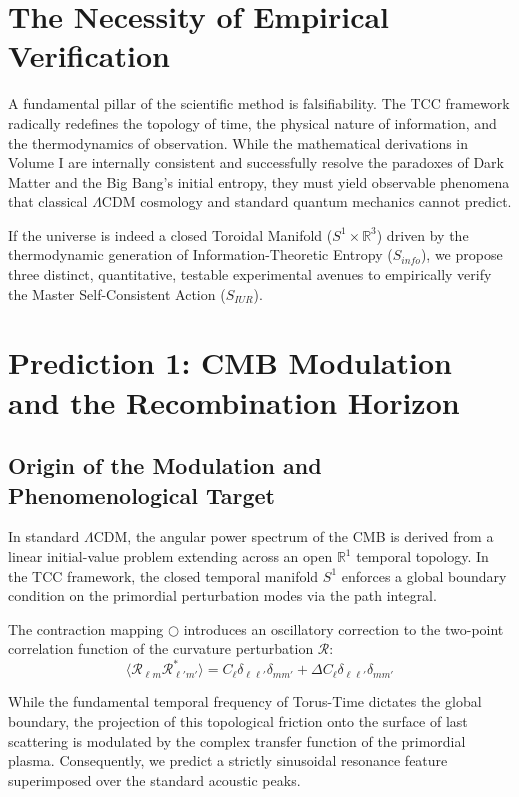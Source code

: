 \documentclass[12pt,openany]{book}
\theoremstyle{plain}
\theoremstyle{definition}
\theoremstyle{remark}
\begin{document}

\chapter{The Necessity of Empirical Verification}

A fundamental pillar of the scientific method is falsifiability. The TCC framework radically redefines the topology of time, the physical nature of information, and the thermodynamics of observation. While the mathematical derivations in Volume I are internally consistent and successfully resolve the paradoxes of Dark Matter and the Big Bang's initial entropy, they must yield observable phenomena that classical $\Lambda$CDM cosmology and standard quantum mechanics cannot predict.

If the universe is indeed a closed Toroidal Manifold ($S^1 \times \mathbb{R}^3$) driven by the thermodynamic generation of Information-Theoretic Entropy ($S_{info}$), we propose three distinct, quantitative, testable experimental avenues to empirically verify the Master Self-Consistent Action ($S_{IUR}$).

\chapter{Prediction 1: CMB Modulation and the Recombination Horizon}
\section{Origin of the Modulation and Phenomenological Target}
In standard $\Lambda$CDM, the angular power spectrum of the CMB is derived from a linear initial-value problem extending across an open $\mathbb{R}^1$ temporal topology. In the TCC framework, the closed temporal manifold $S^1$ enforces a global boundary condition on the primordial perturbation modes via the path integral.

The contraction mapping $\bigcirc$ introduces an oscillatory correction to the two-point correlation function of the curvature perturbation $\mathcal{R}$:
$$ \langle \mathcal{R}_{\ell m} \mathcal{R}^*_{\ell' m'} \rangle = C_\ell \delta_{\ell \ell'} \delta_{m m'} + \Delta C_\ell \delta_{\ell \ell'} \delta_{m m'} $$

While the fundamental temporal frequency of Torus-Time dictates the global boundary, the projection of this topological friction onto the surface of last scattering is modulated by the complex transfer function of the primordial plasma. Consequently, we predict a strictly sinusoidal resonance feature superimposed over the standard acoustic peaks.
\end{document}
